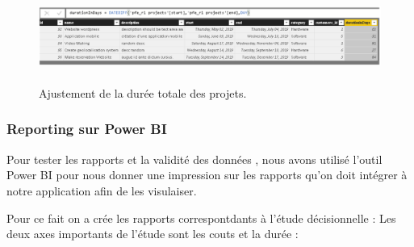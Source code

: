 \bigskip
\bigskip

\FloatBarrier
\begin{figure}[H]
\center
\includegraphics[width=14cm,height=3cm]{./figures/pb2.png}
\caption{Ajustement de la dur\'{e}e totale des projets.}
\end{figure}
\FloatBarrier

\newpage
\subsubsection{Reporting  sur Power BI}
Pour tester les rapports et la validit\'{e} des donn\'{e}es , nous avons utilis\'{e} l'outil
Power BI pour nous donner une impression sur les rapports qu'on doit
int\'{e}grer \`{a} notre application afin de les visulaiser.

\bigskip
Pour ce fait on a cr\'{e}e les rapports correspontdants \`{a} l'\'{e}tude d\'{e}cisionnelle :
Les deux axes importants de l'\'{e}tude sont les couts et la dur\'{e}e :



